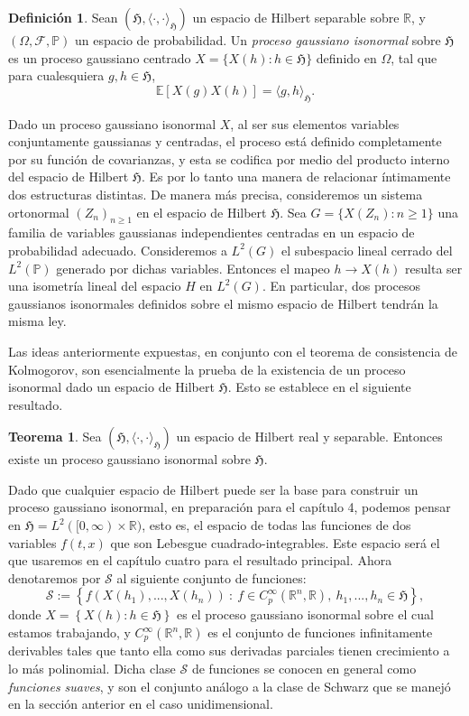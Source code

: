 \documentclass[letterpaper,twoside,12pt]{book}
\newcommand{\R}{\mathbb{R}}
\newcommand{\F}{\mathcal{F}}
\renewcommand{\S}{\mathcal{S}}
\newcommand{\E}{\mathbb{E}}
\renewcommand{\P}{\mathbb{P}}
\newcommand{\1}{\mathds{1}}
\renewcommand{\to}{\rightarrow}
\theoremstyle{definition}
\newtheorem{dfn}{Definición}
\theoremstyle{definition}
\newtheorem{teo}{Teorema}
\theoremstyle{remark}
\theoremstyle{definition}
\theoremstyle{definition}
\theoremstyle{definition}
\theoremstyle{definition}
\theoremstyle{definition}
\begin{document}
\begin{dfn} 
 Sean $(\mathfrak{H},\langle\cdot,\cdot\rangle_{\mathfrak{H}})$ un espacio de Hilbert separable sobre $\R$, y $(\Omega,\F,\P)$ un espacio de probabilidad. Un \textit{proceso gaussiano isonormal} sobre $\mathfrak{H}$ es un proceso gaussiano centrado $X=\{X(h):h\in \mathfrak{H}\}$ definido en $\Omega$, tal que para cualesquiera $g, h\in \mathfrak{H}$, 
 \[
 \E\left[X(g)X(h)\right]=\langle g,h\rangle_{\mathfrak{H}}.
 \]
 \end{dfn}
Dado un proceso gaussiano isonormal $X$, al ser sus elementos variables conjuntamente gaussianas y centradas, el proceso está definido completamente por su función de covarianzas, y esta se codifica por medio del producto interno del espacio de Hilbert $\mathfrak{H}$. Es por lo tanto una manera de relacionar íntimamente dos estructuras distintas. De manera más precisa, consideremos un sistema ortonormal $(Z_n)_{n\geq1}$ en el espacio de Hilbert $\mathfrak{H}$. Sea $G=\{X(Z_n):n\geq1\}$ una familia de variables gaussianas independientes centradas en un espacio de probabilidad adecuado. Consideremos a $L^2(G)$ el subespacio lineal cerrado del $L^2(\P)$ generado por dichas variables. Entonces el mapeo $h\to X(h)$ resulta ser una isometría lineal del espacio $H$ en $L^2(G)$. En particular, dos procesos gaussianos isonormales definidos sobre el mismo espacio de Hilbert tendrán la misma ley.

Las ideas anteriormente expuestas, en conjunto con el teorema de consistencia de Kolmogorov, son esencialmente la prueba de la existencia de un proceso isonormal dado un espacio de Hilbert $\mathfrak{H}$. Esto se establece en el siguiente resultado.

\begin{teo} 
Sea $(\mathfrak{H},\langle\cdot,\cdot\rangle_{\mathfrak{H}})$ un espacio de Hilbert real y separable. Entonces existe un proceso gaussiano isonormal sobre $\mathfrak{H}$.
\end{teo}

Dado que cualquier espacio de Hilbert puede ser la base para construir un proceso gaussiano isonormal, en preparación para el capítulo 4, podemos pensar en $\mathfrak{H}=L^2([0,\infty)\times \R)$, esto es, el espacio de todas las funciones de dos variables $f(t,x)$ que son Lebesgue cuadrado-integrables. Este espacio será el que usaremos en el capítulo cuatro para el resultado principal. Ahora denotaremos por $\S$ al siguiente conjunto de funciones:
\[
\S:=\left\{f(X(h_1),...,X(h_n)) \ : \ f\in C^{\infty}_p(\R^{n},\R), \ h_1,...,h_n\in \mathfrak{H} \right\},
\]
donde $X=\left\{X(h):h\in \mathfrak{H}\right\}$ es el proceso gaussiano isonormal sobre el cual estamos trabajando, y $C^{\infty}_p(\R^{n},\R)$ es el conjunto de funciones infinitamente derivables tales que tanto ella como sus derivadas parciales tienen crecimiento a lo más polinomial. Dicha clase $\S$ de funciones se conocen en general como \textit{funciones suaves}, y son el conjunto análogo a la clase de Schwarz que se manejó en la sección anterior en el caso unidimensional.
\end{document}
